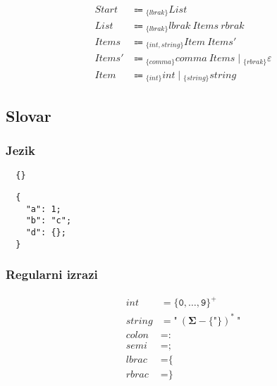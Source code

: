 \documentclass{report}
\newcommand{\Null}{\varepsilon}
\newcommand{\Char}[1]{\texttt{#1}}
\newcommand{\Spc}{\ }
\newcommand{\Union}{\mathrel{|}}
\newcommand{\Kleene}[1]{{#1}^\ast}
\newcommand{\KleenePlus}[1]{#1^+}
\newcommand{\Set}[1]{\symbf{#1}}
\newcommand{\Alphabet}{\Set{\Sigma}}
\newcommand{\Arrow}{\Coloneq}
\newcommand{\NT}[1]{{#1}}
\newcommand{\T}[1]{{#1}}
\newcommand{\Lookahead}[1]{{}_{\{{#1}\}}}
\begin{document}
\begin{equation*}
  \begin{aligned}
    \NT{Start} &\Arrow \Lookahead{\T{lbrak}} \NT{List}\\
    \NT{List} &\Arrow \Lookahead{\T{lbrak}} \T{lbrak} \Spc \NT{Items} \Spc \T{rbrak}\\
    \NT{Items} &\Arrow \Lookahead{\T{int}, \T{string}} \NT{Item} \Spc \NT{Items'}\\
    \NT{Items'} &\Arrow \Lookahead{\T{comma}} \T{comma} \Spc \NT{Items} \Union \Lookahead{\T{rbrak}} \Null\\
    \NT{Item} &\Arrow \Lookahead{\T{int}} \T{int} \Union \Lookahead{\T{string}} \T{string}
  \end{aligned}
\end{equation*}

\subsection{Slovar}

\subsubsection*{Jezik}
\begin{verbatim}
  {}
\end{verbatim}
\begin{verbatim}
  {
    "a": 1;
    "b": "c";
    "d": {};
  }
\end{verbatim}

\subsubsection*{Regularni izrazi}
\begin{equation*}
  \begin{aligned}
    \T{int} &= \KleenePlus{\{\Char{0}, \dots, \Char{9}\}}\\
    \T{string} &= \Char{"} \Spc \Kleene{(\Alphabet - \{\Char{"}\})} \Spc \Char{"}\\
    \T{colon} &= \Char{:}\\
    \T{semi} &= \Char{;}\\
    \T{lbrac} &= \Char{\{}\\
    \T{rbrac} &= \Char{\}}\\
  \end{aligned}
\end{equation*}
\end{document}
